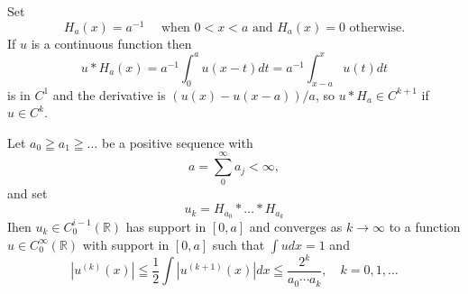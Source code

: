 Set
\begin{equation}
    H_{a}(x)=a^{-1} \quad \text{ when } 0<x<a \text{ and } H_{a}(x)=0 \text{ otherwise.}
\end{equation}
If $u$ is a continuous function then
\[
	u * H_{a}(x)=a^{-1} \int_{0}^{a} u(x-t) d t=a^{-1} \int_{x-a}^{x} u(t) d t
\]
is in $C^{1}$ and the derivative is $(u(x)-u(x-a)) / a$, so $u * H_{a} \in C^{k+1}$ if $u \in C^{k}$.
\begin{theorem}\label{Theorem 1.3.5}
    Let $a_{0} \geqq a_{1} \geqq \ldots$ be a positive sequence with
\[
    a=\sum_{0}^{\infty} a_{j}<\infty,
\]
and set
\[
		u_{k} =H_{a_{0}} * \ldots * H_{a_{k}}
\]
Ihen $u_{k} \in C_{0}^{i-1}(\mathbb{R})$ has support in $[0, a]$ and converges as $k \rightarrow \infty$ to a function $u \in C_{0}^{\infty}(\mathbb{R})$ with support in $[0, a]$ such that $\int u d x=1$ and
\begin{equation}
    \label{(1.3.12)}
    \left|u^{(k)}(x)\right| \leqq \frac{1}{2} \int\left|u^{(k+1)}(x)\right| d x \leqq \frac{2^{k}}{a_{0} \cdots a_{k}}, \quad k=0,1, \ldots
\end{equation}
\end{theorem}
